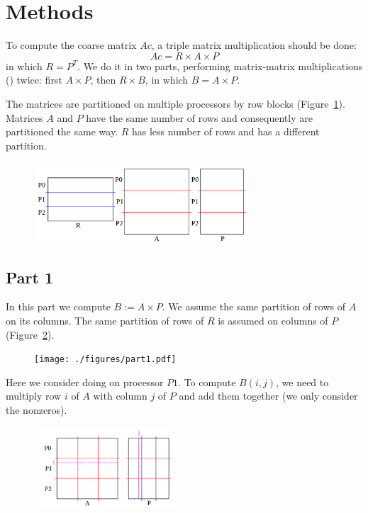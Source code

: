 \section{Methods}
\label{sec:methods}

To compute the coarse matrix $Ac$, a triple matrix multiplication should be done:
\begin{equation}
 Ac = R \times A \times P
\end{equation}
in which $R = P^T$. We do it in two parts, performing matrix-matrix multiplications (\matmult) twice: first $A \times P$, then $R \times B$, in which $B = A \times P$.

The matrices are partitioned on multiple processors by row blocks (Figure~\ref{fig:partition}). Matrices $A$ and $P$ have the same number of rows and consequently are partitioned the same way. $R$ has less number of rows and has a different partition.

\begin{figure}[tbh]
 \centering
 \includegraphics[width=8cm,height=3cm]{./figures/partition.pdf}
 \caption{}
 \label{fig:partition}
\end{figure}

\subsection{Part 1}

In this part we compute $B := A \times P$. We assume the same partition of rows of $A$ on its columns. The same partition of rows of $R$ is assumed on columns of $P$ (Figure~\ref{fig:part1}).

\begin{figure}[tbh]
 \centering
 \texttt{[image: ./figures/part1.pdf]}
 \caption{}
 \label{fig:part1}
\end{figure}

Here we consider doing \matmult on processor $P1$. To compute $B(i, j)$, we need to multiply row $i$ of $A$ with column $j$ of $P$ and add them together (we only consider the nonzeros).

\begin{figure}[tbh]
 \centering
 \includegraphics[width=5.5cm,height=3cm]{./figures/part1b.pdf}
 \caption{}
 \label{fig:part1b}
\end{figure}

